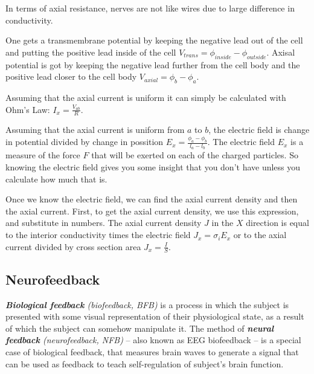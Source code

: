 \documentclass[14pt,a4paper]{scrartcl}
\begin{document}
In terms of axial resistance, nerves are not like wires due to large difference in conductivity. 

One gets a transmembrane potential by keeping the negative lead out of the cell and putting the positive lead inside of the cell $V_{trans} = \phi_{inside} - \phi_{outside}$. Axisal potential is got by keeping the negative lead further from the cell body and the positive lead closer to the cell body $V_{axial} = \phi_{b} - \phi_{a}$. 

Assuming that the axial current is uniform it can simply be calculated with Ohm's Law: $I_{x} = \frac{V_{ab}}{R}$.

Assuming that the axial current is uniform from $a$ to $b$, the electric field is change in potential divided by change in possition $E_{x} = \frac{\phi_{a}-\phi_{b}}{l_{a}-l_{b}}$. The electric field $E_{x}$ is a measure of the force $F$ that will be exerted on each of the charged particles. So knowing the electric field gives you some insight that you don't have unless you calculate how much that is.

Once we know the electric field, we can find the axial current density and then the axial current. First, to get the axial current density, we use this expression, and substitute in numbers. The axial current density $J$ in the $X$ direction is equal to the interior conductivity times the electric field $J_{x}=\sigma_{i}E_{x}$ or to the  axial current divided by cross section area $J_{x}=\frac{I}{S}$. 



\subsection{Neurofeedback}
\label{sec:Hypothesis:Neurofeedback}

\textit{\textbf{Biological feedback} (biofeedback, BFB)} is a process in which the subject is presented with some visual representation of their physiological state, as a result of which the subject can somehow manipulate it. The method of \textit{\textbf{neural feedback} (neurofeedback, NFB)} – also known as EEG biofeedback – is a special case of biological feedback, that measures brain waves to generate a signal that can be used as feedback to teach self-regulation of subject's brain function. 
\end{document}
